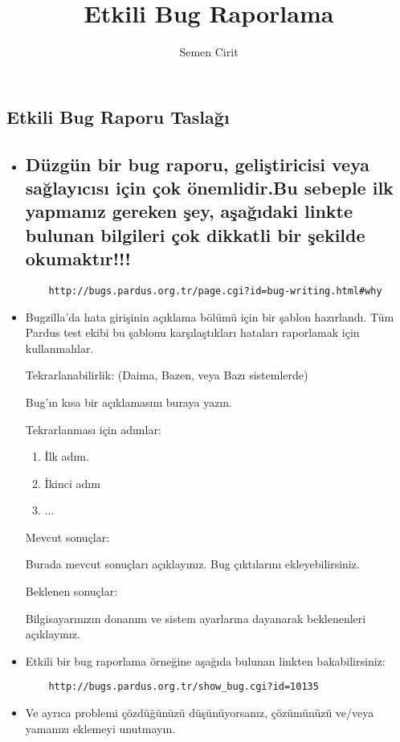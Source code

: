 \documentclass[a4paper,10pt]{article}
\title{Etkili Bug Raporlama}
\author{Semen Cirit}
\begin{document}
\maketitle

\subsection*{Etkili Bug Raporu Taslağı}

\begin{itemize}
 
  	\item \subsection*{Düzgün bir  bug raporu, geliştiricisi veya sağlayıcısı için çok önemlidir.Bu sebeple ilk yapmanız gereken şey, aşağıdaki linkte bulunan bilgileri çok dikkatli bir şekilde okumaktır!!!}
	\begin{verbatim} 
 	http://bugs.pardus.org.tr/page.cgi?id=bug-writing.html#why
	\end{verbatim}


  	\item Bugzilla'da hata girişinin açıklama bölümü için bir şablon hazırlandı. Tüm Pardus test ekibi bu şablonu karşılaştıkları hataları raporlamak için kullanmalılar.

   	Tekrarlanabilirlik: (Daima, Bazen, veya Bazı sistemlerde)	
   
    	Bug'ın kısa bir açıklamasını buraya yazın.
   
   	Tekrarlanması için adımlar:
   	\begin{enumerate}
    	\item İlk adım.
    	\item İkinci adım
    	\item ...
   	\end{enumerate}

	Mevcut sonuçlar:

	Burada mevcut sonuçları açıklayınız. Bug çıktılarını ekleyebilirsiniz.
	
	Beklenen sonuçlar:

	Bilgisayarınızın donanım ve sistem ayarlarına dayanarak beklenenleri açıklayınız.
	
	\item Etkili bir bug raporlama örneğine aşağıda bulunan linkten bakabilirsiniz:
	\begin{verbatim}
	http://bugs.pardus.org.tr/show_bug.cgi?id=10135
	\end{verbatim}
	\item Ve ayrıca problemi çözdüğünüzü düşünüyorsanız, çözümünüzü ve/veya yamanızı eklemeyi unutmayın.


\end{itemize}
\end{document}
